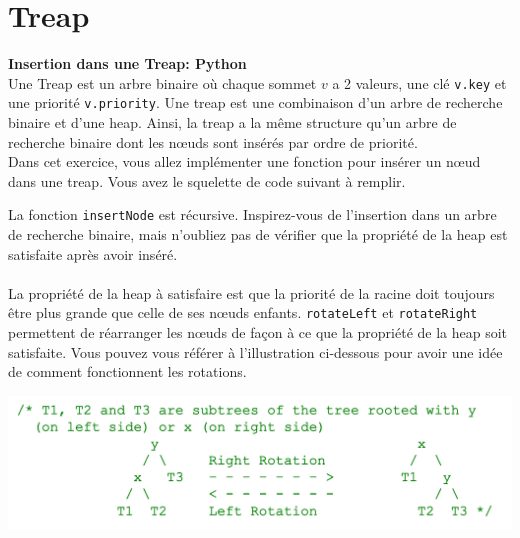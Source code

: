 \section{Treap}
\begin{Exercice}[20 minutes]\textbf{Insertion dans une Treap: Python} \optionnel\\
    Une Treap est un arbre binaire où chaque sommet $v$ a 2 valeurs, une clé \lstinline{v.key} et une priorité \lstinline{v.priority}. Une treap est une
    combinaison d'un arbre de recherche binaire et d'une heap. Ainsi, la treap a la même structure qu'un arbre de recherche binaire dont les nœuds sont
    insérés par ordre de priorité. \\

    Dans cet exercice, vous allez implémenter une fonction pour insérer un nœud dans une treap. Vous avez le squelette de code suivant à remplir.
    

    \begin{conseil}
        La fonction \lstinline{insertNode} est récursive. Inspirez-vous de l'insertion dans un arbre de recherche binaire, mais 
        n'oubliez pas de vérifier que la propriété de la heap est satisfaite après avoir inséré. \\\\
        La propriété de la heap à satisfaire est que la priorité de la racine doit toujours être plus grande que celle de ses nœuds enfants.
        \lstinline{rotateLeft} et \lstinline{rotateRight} permettent de réarranger les nœuds de façon à ce que la propriété
        de la heap soit satisfaite. Vous pouvez vous référer à l'illustration ci-dessous pour avoir une idée de comment fonctionnent les rotations.
    \end{conseil}

    \begin{center}
        \includegraphics[width=\linewidth]{treap_heap_property.png}
    \end{center}

    \begin{solution}
    
    \end{solution}
    \begin{solution}
        
    \end{solution}
    
\end{Exercice}



